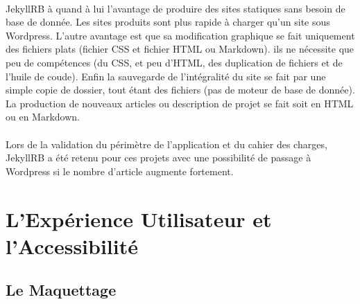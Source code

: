 \documentclass[11pt,a4paper]{report}
\begin{document}
		\paragraph*{}JekyllRB à quand à lui l'avantage de produire des sites statiques sans besoin de base de donnée. Les sites produits sont plus rapide à charger qu'un site sous Wordpress. L'autre avantage est que sa modification graphique se fait uniquement des fichiers plats (fichier CSS et fichier HTML ou Markdown). ils ne nécessite que peu de compétences (du CSS, et peu d'HTML, des duplication de fichiers et de l'huile de coude). Enfin la sauvegarde de l'intégralité du site se fait par une simple copie de dossier, tout étant des fichiers (pas de moteur de base de donnée). La production de nouveaux articles ou description de projet se fait soit en HTML ou en Markdown.
		\paragraph*{}Lors de la validation du périmètre de l'application et du cahier des charges, JekyllRB a été retenu pour ces projets avec une possibilité de passage à Wordpress si le nombre d'article augmente fortement.
		\newpage

	\section{L'Expérience Utilisateur et l'Accessibilité}
		\subsection{Le Maquettage}
\end{document}
